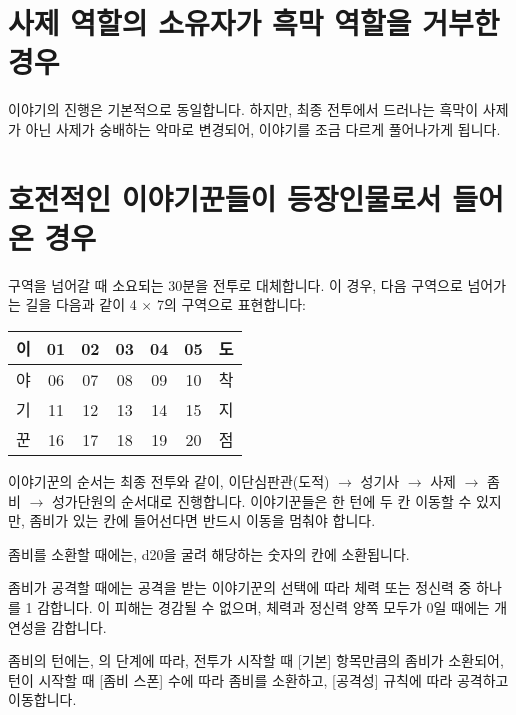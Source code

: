 \documentclass{report}
\begin{document}
	\hypertarget{alternative:no-criminal}{}
	\section{사제 역할의 소유자가 흑막 역할을 거부한 경우}
		이야기의 진행은 기본적으로 동일합니다. 하지만, 최종 전투에서 드러나는 흑막이 사제가 아닌 사제가 숭배하는 악마로 변경되어, 이야기를 조금 다르게 풀어나가게 됩니다.
	
	\hypertarget{alternative:war-ready}{}
	\section{호전적인 이야기꾼들이 등장인물로서 들어온 경우}
		구역을 넘어갈 때 소요되는 30분을 전투로 대체합니다. 이 경우, 다음 구역으로 넘어가는 길을 다음과 같이 4 $\times$ 7의 구역으로 표현합니다:
		
		\begin{center}
			\begin{tabular}{|c|c|c|c|c|c|c|}
				\hline
				이 & 01 & 02 & 03 & 04 & 05 & 도 \\\hline
				야 & 06 & 07 & 08 & 09 & 10 & 착 \\\hline
				기 & 11 & 12 & 13 & 14 & 15 & 지 \\\hline
				꾼 & 16 & 17 & 18 & 19 & 20 & 점 \\\hline
			\end{tabular}
		\end{center}
		
		이야기꾼의 순서는 최종 전투와 같이, 이단심판관(도적) $\rightarrow$ 성기사 $\rightarrow$ 사제 $\rightarrow$ 좀비 $\rightarrow$ 성가단원의 순서대로 진행합니다. 이야기꾼들은 한 턴에 두 칸 이동할 수 있지만, 좀비가 있는 칸에 들어선다면 반드시 이동을 멈춰야 합니다.
		
		좀비를 소환할 때에는, d20을 굴려 해당하는 숫자의 칸에 소환됩니다.
		
		좀비가 공격할 때에는 공격을 받는 이야기꾼의 선택에 따라 체력 또는 정신력 중 하나를 1 감합니다. 이 피해는 경감될 수 없으며, 체력과 정신력 양쪽 모두가 0일 때에는 개연성을 감합니다.
		
		좀비의 턴에는, 의 단계에 따라, 전투가 시작할 때 [기본] 항목만큼의 좀비가 소환되어, 턴이 시작할 때 [좀비 스폰] 수에 따라 좀비를 소환하고, [공격성] 규칙에 따라 공격하고 이동합니다.
		
\end{document}
